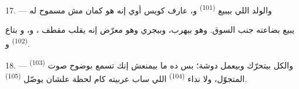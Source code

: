 \VUsaut{4.0mm}
\VUsaut{3.0mm}

17. --- والولد اللي بيبيع  \textsuperscript{(101)} و، عارف
كويس أوي إنه هو كمان مش مسموح له

يبيع بضاعته جنب السوق. وهو بيهرب، وبيجري وهو معرّض إنه يقلب مقطف
، و، و بتاع 
\textsuperscript{(102)}  و.

18. --- والكل بيتحرّك وبيعمل دوشة؛ بس ده ما بيمنعش إنك تسمع بوضوح صوت
 \textsuperscript{(103)} المتجوّل، ولا نداء 
\textsuperscript{(104)} اللي ساب عربيته كام لحظة علشان يوصّل 
\textsuperscript{(105)}.

\VUsaut{6.0mm}
\VUfilet{22mm}
